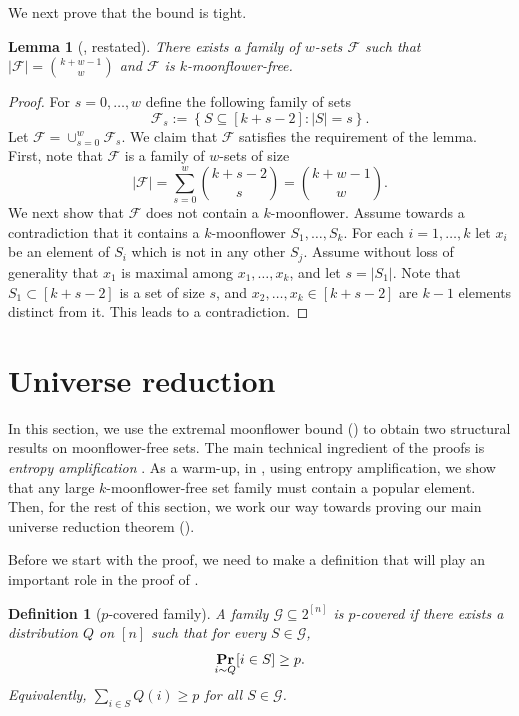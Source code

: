 \documentclass{article}
\newtheorem{lemma}[lemma]{Lemma}
\newtheorem{definition}[definition]{Definition}
\renewcommand{\Pr}{\mathop{\bf Pr\/}}
\newcommand{\<}{\langle}
\renewcommand{\>}{\rangle}
\newcommand{\calF}{\mathcal{F}}
\newcommand{\calG}{\mathcal{G}}
\begin{document}
We next prove that the bound is tight.

\begin{lemma}[, restated]\label{lem:WSF_lower_bnd_restated}
    There exists a family of $w$-sets $\calF$ such that $|\calF| = \binom{k+w-1}{w}$ and $\calF$ is $k$-moonflower-free. 
\end{lemma}

\begin{proof}
    For $s=0,\ldots,w$ define the following family of sets
    \[
    \calF_s := \left\{S \subseteq [k+s-2]: |S| = s \right\}.
    \]
    Let $\calF = \cup_{s=0}^w \calF_s$. We claim that $\calF$ satisfies the requirement of the lemma.
    First, note that $\calF$ is a family of $w$-sets of size
    \[
    |\calF| = \sum_{s=0}^w {k+s-2 \choose s} = {k+w-1 \choose w}.
    \]    
    We next show that $\calF$ does not contain a $k$-moonflower. Assume towards a contradiction that it contains a $k$-moonflower $S_1,\ldots,S_k$. For each $i=1,\ldots,k$ let $x_i$ be an element of $S_i$ which is not in any other $S_j$. Assume without loss of generality that $x_1$ is maximal among $x_1,\ldots,x_k$, and let $s=|S_1|$. Note that $S_1 \subset [k+s-2]$ is a set of size $s$, and $x_2,\ldots,x_k \in [k+s-2]$ are $k-1$ elements distinct from it. This leads to a contradiction.
\end{proof}



\section{Universe reduction}\label{sec:universe_reduction}
In this section, we use the extremal moonflower bound () to obtain two structural results on moonflower-free sets. The main technical ingredient of the proofs is \emph{entropy amplification} \cite{Gil22, Saw23}. As a warm-up, in , using entropy amplification, we show that any large $k$-moonflower-free set family must contain a popular element. Then, for the rest of this section, we work our way towards proving our main universe reduction theorem ().

Before we start with the proof, we need to make a
definition that will play an important role in the proof of . 

\begin{definition}[$p$-covered family]
    A family $\calG \subseteq 2^{[n]}$ is \emph{$p$-covered} if there exists a distribution $Q$ on $[n]$ such that for every $S \in \calG$,
    \[
    \Pr_{i \sim Q} [i \in S] \geq p.
    \]
    Equivalently, $\sum_{i \in S} Q(i) \geq p$ for all $S \in \calG$.
\end{definition}
\end{document}
